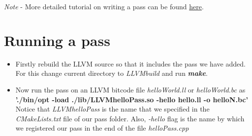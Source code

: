\textit{Note} - More detailed tutorial on writing a pass can be found 
\href{http://llvm.org/docs/WritingAnLLVMPass.html#quick-start-writing-hello-world}{here}.

\section{Running a pass}
\begin{itemize}
    \item Firstly rebuild the LLVM source so that it includes the 
    pass we have added. For this change current directory to \textit
    {LLVMbuild} and run \textbf{\textit{make}}.
    \item Now run the pass on an LLVM bitcode file 
    \textit{helloWorld.ll} or \textit{helloWorld.bc} as \\
        \textbf{'./bin/opt -load ./lib/LLVMhelloPass.so -hello hello.ll -o helloN.bc'}\\
        Notice that \textit{LLVMhelloPass} is the name that we 
        specified in the \textit{CMakeLists.txt} file of our pass 
        folder. Also, \textit{-hello} flag is the name by which we 
        registered our pass in the end of the file \textit
          {helloPass.cpp}

\end{itemize}